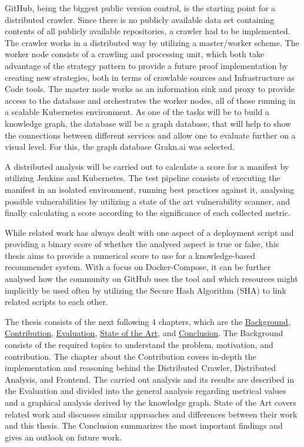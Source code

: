GitHub, being the biggest public version control, is the starting point for a distributed crawler. Since there is no publicly available data set containing contents of all publicly available repositories, a crawler had to be implemented. The crawler works in a distributed way by utilizing a master/worker scheme. The worker node consists of a crawling and processing unit, which both take advantage of the strategy pattern to provide a future proof implementation by creating new strategies, both in terms of crawlable sources and Infrastructure as Code tools. The master node works as an information sink and proxy to provide access to the database and orchestrates the worker nodes, all of those running in a scalable Kubernetes environment.
As one of the tasks will be to build a knowledge graph, the database will be a graph database, that will help to show the connections between different services and allow one to evaluate further on a visual level. For this, the graph database Grakn.ai was selected.

A distributed analysis will be carried out to calculate a score for a manifest by utilizing Jenkins and Kubernetes. The test pipeline consists of executing the manifest in an isolated environment, running best practices against it, analysing possible vulnerabilities by utilizing a state of the art vulnerability scanner, and finally calculating a score according to the significance of each collected metric.

While related work has always dealt with one aspect of a deployment script and providing a binary score of whether the analysed aspect is true or false, this thesis aims to provide a numerical score to use for a knowledge-based recommender system. With a focus on Docker-Compose, it can be further analysed how the community on GitHub uses the tool and which resources might implicitly be used often by utilizing the Secure Hash Algorithm (SHA) to link related scripts to each other.

The thesis consists of the next following 4 chapters, which are the \hyperref[sec:background]{Background}, \hyperref[sec:contribution]{Contribution}, \hyperref[sec:evaluation]{Evaluation}, \hyperref[sec:stateofart]{State of the Art}, and \hyperref[sec:conclusion]{Conclusion}. The Background consists of the required topics to understand the problem, motivation, and contribution. The chapter about the Contribution covers in-depth the implementation and reasoning behind the Distributed Crawler, Distributed Analysis, and Frontend. The carried out analysis and its results are described in the Evaluation and divided into the general analysis regarding metrical values and a graphical analysis derived by the knowledge graph. State of the Art covers related work and discusses similar approaches and differences between their work and this thesis. The Conclusion summarizes the most important findings and gives an outlook on future work.